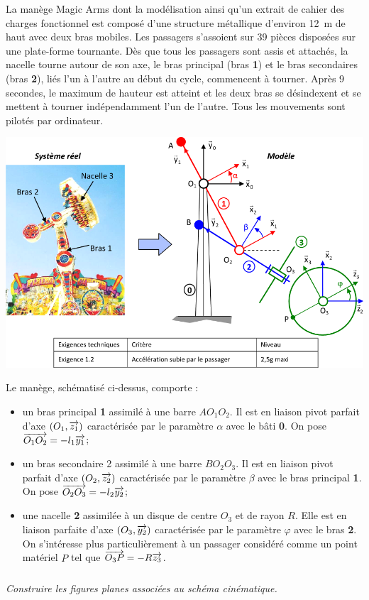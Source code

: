 \documentclass[10pt,fleqn]{article} %
\begin{document}

\vspace{5cm}
\pagestyle{fancy}
\thispagestyle{plain}


\def\columnseprulecolor{\color{ocre}}
\setlength{\columnseprule}{0.4pt} 

\ifprof
\else
\begin{multicols}{2}
\fi


La manège Magic Arms dont la modélisation ainsi qu'un extrait de cahier des charges fonctionnel est composé d'une structure métallique d'environ \SI{12}{m} de haut avec deux bras mobiles. Les passagers s'assoient sur 39 pièces disposées sur une plate-forme tournante. Dès que tous les passagers sont assis et attachés, la nacelle tourne autour de son axe, le bras principal (bras \textbf{1}) et le bras secondaires (bras \textbf{2}), liés l'un à l'autre au début du cycle, commencent à tourner. Après 9 secondes, le maximum de hauteur est atteint et les deux bras se désindexent et se mettent à tourner indépendamment l'un de l'autre. Tous les mouvements sont pilotés par ordinateur. 

\begin{center}
\includegraphics[width=\linewidth]{images/img1}
\end{center}

Le manège, schématisé ci-dessus, comporte :
\begin{itemize}
\item un bras principal \textbf{1} assimilé à une barre $AO_1O_2$. Il est en liaison pivot parfait d'axe $(O_1,\overrightarrow{z_1})$ caractérisée par le paramètre $\alpha$ avec le bâti \textbf{0}. On pose $\overrightarrow{O_1O_2}=-l_1\overrightarrow{y_1}$;
\item un bras secondaire 2 assimilé à une barre $BO_2O_3$. Il est en liaison pivot parfait d'axe $(O_2,\overrightarrow{z_2})$ caractérisée par le paramètre $\beta$ avec le bras principal \textbf{1}. On pose $\overrightarrow{O_2O_3}=-l_2\overrightarrow{y_2}$;
\item une nacelle \textbf{2} assimilée à un disque de centre $O_3$ et de rayon $R$. Elle est en liaison parfaite d'axe $(O_3,\overrightarrow{y_2})$ caractérisée par le paramètre $\varphi$ avec le bras \textbf{2}. On s'intéresse plus particulièrement à un passager considéré comme un point matériel $P$ tel que $\overrightarrow{O_3P}=-R\overrightarrow{z_3}$.
\end{itemize}
\subparagraph{}
\textit{Construire les figures planes associées au schéma cinématique.}
\ifprof


\end{multicols}
\end{document}
